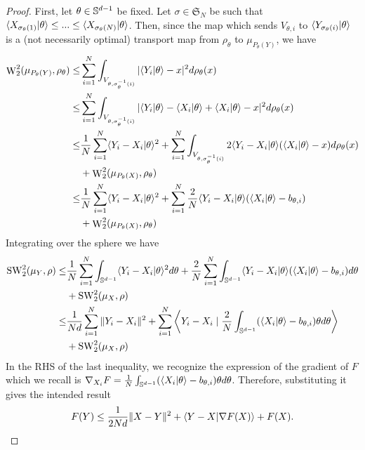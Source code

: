 \begin{proof}
    First, let $\theta \in \mathbb S^{d-1}$ be fixed. Let $\sigma \in \mathfrak{S}_N$ be such that $\langle X_{\sigma_\theta(1)}|\theta\rangle \leq ... \leq \langle X_{\sigma_\theta(N)}|\theta\rangle$. Then, since the map which sends $V_{\theta,i}$ to $\langle Y_{\sigma_\theta(i)}|\theta\rangle$ is a (not necessarily optimal) transport map from $\rho_\theta$ to $\mu_{P_\theta(Y)}$, we have
    \begin{align}
        \mathop{\mathrm{W}}\nolimits_2^2(\mu_{P_\theta(Y)}, \rho_\theta) \leq& \sum_{i=1}^N \int_{V_{\theta,\sigma_\theta^{-1}(i)}} |\langle Y_i|\theta\rangle - x|^2 d\rho_\theta(x) \\
            \leq& \sum_{i=1}^N \int_{V_{\theta,\sigma_\theta^{-1}(i)}} |\langle Y_i|\theta\rangle - \langle X_i|\theta\rangle + \langle X_i|\theta\rangle - x|^2 d\rho_\theta(x) \\
            \leq& \frac{1}{N} \sum_{i=1}^N \langle Y_i-X_i|\theta\rangle^2 + \sum_{i=1}^N \int_{V_{\theta,\sigma_\theta^{-1}(i)}} 2\langle Y_i-X_i|\theta\rangle(\langle X_i|\theta\rangle  - x) d\rho_\theta(x) \\
            &+ \mathop{\mathrm{W}}\nolimits_2^2(\mu_{P_\theta(X)}, \rho_\theta) \\
            \leq& \frac{1}{N} \sum_{i=1}^N \langle Y_i-X_i|\theta\rangle^2 + \sum_{i=1}^N \frac{2}{N} \langle Y_i-X_i|\theta\rangle(\langle X_i|\theta\rangle  - b_{\theta,i}) \\
            &+ \mathop{\mathrm{W}}\nolimits_2^2(\mu_{P_\theta(X)}, \rho_\theta)
    \end{align}
    Integrating over the sphere we have 
    \begin{align}
        \mathop{\mathrm{SW}}\nolimits_2^2(\mu_Y, \rho) \leq& \frac{1}{N} \sum_{i=1}^N \int_{\mathbb S^{d-1}} \langle Y_i-X_i|\theta\rangle^2 d\theta + \frac{2}{N} \sum_{i=1}^N \int_{\mathbb S^{d-1}} \langle Y_i-X_i|\theta\rangle (\langle X_i|\theta\rangle  - b_{\theta,i})d\theta \\
            &+ \mathop{\mathrm{SW}}\nolimits_2^2(\mu_X, \rho) \\
         \leq& \frac{1}{Nd} \sum_{i=1}^N \|Y_i-X_i\|^2  + \sum_{i=1}^N \left\langle Y_i-X_i \mid \frac{2}{N} \int_{\mathbb S^{d-1}} (\langle X_i|\theta\rangle  - b_{\theta,i})\theta d\theta \right\rangle \\
         &+ \mathop{\mathrm{SW}}\nolimits_2^2(\mu_X, \rho)
    \end{align}
    In the RHS of the last inequality, we recognize the expression of the gradient of $F$ which we recall is $\nabla_{X_i} F = \frac{1}{N} \int_{\mathbb S^{d-1}} (\langle X_i|\theta\rangle - b_{\theta,i})\theta d\theta$. Therefore, substituting it gives the intended result
    \begin{equation}
        F(Y) \leq \frac{1}{2Nd} \|X-Y\|^2 + \langle Y-X|\nabla F(X)\rangle  + F(X).  \qedhere 
    \end{equation}
\end{proof}

